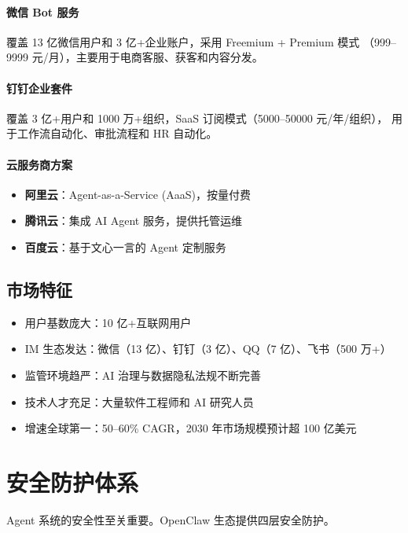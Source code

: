 \documentclass[
  customlatinfont = macos,
]{hkustthesis}
\begin{document}
\paragraph{微信 Bot 服务}
覆盖 13 亿微信用户和 3 亿+企业账户，采用 Freemium + Premium 模式
（999--9999 元/月），主要用于电商客服、获客和内容分发。

\paragraph{钉钉企业套件}
覆盖 3 亿+用户和 1000 万+组织，SaaS 订阅模式（5000--50000 元/年/组织），
用于工作流自动化、审批流程和 HR 自动化。

\paragraph{云服务商方案}

\begin{itemize}[nosep]
  \item \textbf{阿里云}：Agent-as-a-Service (AaaS)，按量付费
  \item \textbf{腾讯云}：集成 AI Agent 服务，提供托管运维
  \item \textbf{百度云}：基于文心一言的 Agent 定制服务
\end{itemize}

\subsection{市场特征}

\begin{itemize}[nosep]
  \item 用户基数庞大：10 亿+互联网用户
  \item IM 生态发达：微信（13 亿）、钉钉（3 亿）、QQ（7 亿）、飞书（500 万+）
  \item 监管环境趋严：AI 治理与数据隐私法规不断完善
  \item 技术人才充足：大量软件工程师和 AI 研究人员
  \item 增速全球第一：50--60\% CAGR，2030 年市场规模预计超 100 亿美元
\end{itemize}


\section{安全防护体系}

Agent 系统的安全性至关重要。OpenClaw 生态提供四层安全防护。
\end{document}
